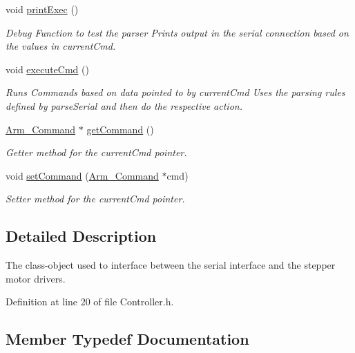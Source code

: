 \begin{DoxyCompactItemize}
void \hyperlink{class_controller_a8ad1d152a91997ab3825f32d2dcecfd4}{print\+Exec} ()
\begin{DoxyCompactList}\small\item\em Debug Function to test the parser Prints output in the serial connection based on the values in current\+Cmd. \end{DoxyCompactList}\item 
void \hyperlink{class_controller_ac1fc6cd2f507cc05e66a602e809c2446}{execute\+Cmd} ()
\begin{DoxyCompactList}\small\item\em Runs Commands based on data pointed to by current\+Cmd Uses the parsing rules defined by parse\+Serial and then do the respective action. \end{DoxyCompactList}\item 
\hyperlink{class_controller_ac48cc99091f83f149fef8f17fd5d7e7f}{Arm\+\_\+\+Command} $\ast$ \hyperlink{class_controller_af746c7701fda226720efe02890a308b2}{get\+Command} ()
\begin{DoxyCompactList}\small\item\em Getter method for the current\+Cmd pointer. \end{DoxyCompactList}\item 
void \hyperlink{class_controller_a951ce5ec5a6e653e9dd78b36351d80c5}{set\+Command} (\hyperlink{class_controller_ac48cc99091f83f149fef8f17fd5d7e7f}{Arm\+\_\+\+Command} $\ast$cmd)
\begin{DoxyCompactList}\small\item\em Setter method for the current\+Cmd pointer. \end{DoxyCompactList}\end{DoxyCompactItemize}


\subsection{Detailed Description}
The class-\/object used to interface between the serial interface and the stepper motor drivers. 

Definition at line 20 of file Controller.\+h.



\subsection{Member Typedef Documentation}
\mbox{\label{class_controller_ac48cc99091f83f149fef8f17fd5d7e7f}} 
